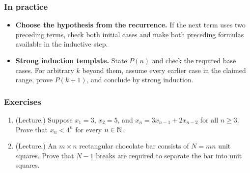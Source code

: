 \subsubsection*{In practice}
\begin{itemize}
    \item \textbf{Choose the hypothesis from the recurrence.} If the next
    term uses two preceding terms, check both initial cases and make both
    preceding formulas available in the inductive step.
    \item \textbf{Strong induction template.} State $P(n)$ and check the
    required base cases. For arbitrary $k$ beyond them, assume every earlier
    case in the claimed range, prove $P(k+1)$, and conclude by strong induction.
\end{itemize}

\subsubsection*{Exercises}
\begin{enumerate}
    \item (Lecture.) Suppose $x_1=3$, $x_2=5$, and
    $x_n=3x_{n-1}+2x_{n-2}$ for all $n\geq3$.
    Prove that $x_n<4^n$ for every $n\in\mathbb{N}$.
    \item (Lecture.) An $m\times n$ rectangular chocolate bar consists of
    $N=mn$ unit squares. Prove that $N-1$ breaks are required to separate
    the bar into unit squares.
\end{enumerate}
